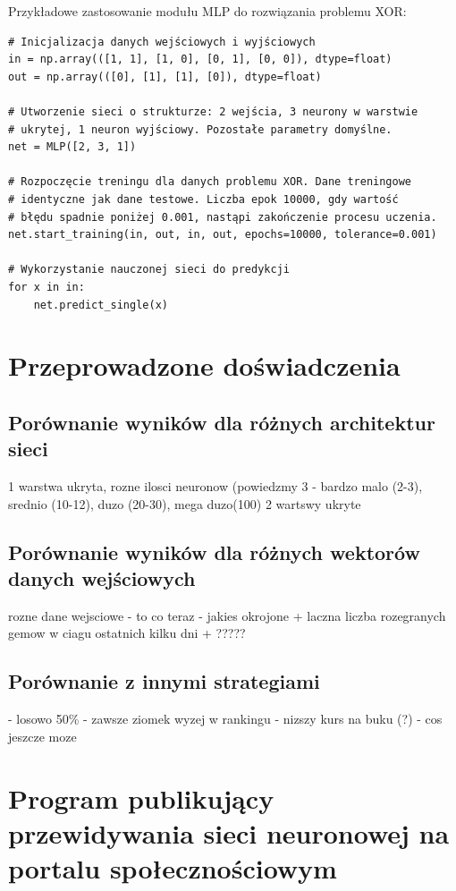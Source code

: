 \pagebreak

Przykładowe zastosowanie modułu MLP do rozwiązania problemu XOR:
\begin{verbatim}
# Inicjalizacja danych wejściowych i wyjściowych
in = np.array(([1, 1], [1, 0], [0, 1], [0, 0]), dtype=float)
out = np.array(([0], [1], [1], [0]), dtype=float)

# Utworzenie sieci o strukturze: 2 wejścia, 3 neurony w warstwie 
# ukrytej, 1 neuron wyjściowy. Pozostałe parametry domyślne.
net = MLP([2, 3, 1])

# Rozpoczęcie treningu dla danych problemu XOR. Dane treningowe 
# identyczne jak dane testowe. Liczba epok 10000, gdy wartość
# błędu spadnie poniżej 0.001, nastąpi zakończenie procesu uczenia.
net.start_training(in, out, in, out, epochs=10000, tolerance=0.001)

# Wykorzystanie nauczonej sieci do predykcji
for x in in:
    net.predict_single(x)
\end{verbatim}



\chapter{Przeprowadzone doświadczenia}
\section{Porównanie wyników dla różnych architektur sieci}
\label{Sec:VsArch}

1 warstwa ukryta, rozne ilosci neuronow (powiedzmy 3 - bardzo malo (2-3), srednio (10-12), duzo (20-30), mega duzo(100)
2 wartswy ukryte

\section{Porównanie wyników dla różnych wektorów danych wejściowych}
\label{Sec:VsXIn}
rozne dane wejsciowe
- to co teraz
- jakies okrojone
+ laczna liczba rozegranych gemow w ciagu ostatnich kilku dni
+ ?????


\section{Porównanie z innymi strategiami}
\label{Sec:VsStrat}
- losowo 50\%
- zawsze ziomek wyzej w rankingu
- nizszy kurs na buku (?)
- cos jeszcze moze

\chapter{Program publikujący przewidywania sieci neuronowej na portalu społecznościowym}

